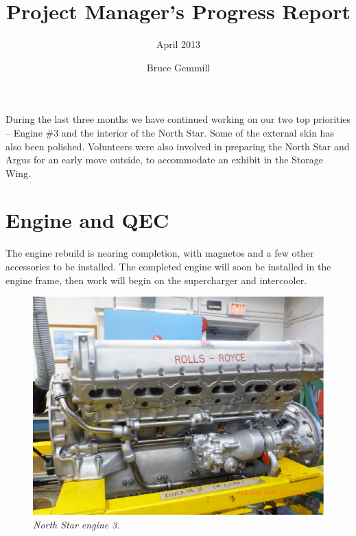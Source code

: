 
%


\title{Project Manager's Progress Report}
\subtitle{April 2013}
\author{Bruce Gemmill}

\maketitle

During the last three months we have continued working on our two top
priorities -- Engine \#3 and the interior of the North Star.  Some of
the external skin has also been polished.  Volunteers were also
involved in preparing the North Star and Argus for an early move
outside, to accommodate an exhibit in the Storage Wing.

\section{Engine and QEC}
\label{sec:engines}

The engine rebuild is nearing completion, with magnetos and a few
other accessories to be installed.  The completed engine will soon be
installed in the engine frame, then work will begin on the
supercharger and intercooler.

\begin{figure}[htbp]
   \vspace{2em}
   \centering
   \includegraphics[scale=0.5]{engine3.eps}
   \caption*{\small \em North Star engine 3.}
   \label{fig:engine3}
\end{figure}


